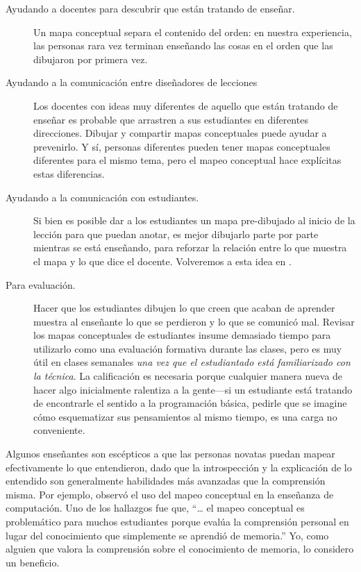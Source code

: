 \begin{description}

\item[Ayudando a docentes para descubrir que están tratando de enseñar.]
  Un mapa conceptual separa el contenido del orden:
  en nuestra experiencia,
  las personas rara vez terminan enseñando las cosas en el orden que las dibujaron por primera vez.

\item[Ayudando a la comunicación entre diseñadores de lecciones]
  Los docentes con ideas muy diferentes de aquello que están tratando de enseñar es probable que arrastren a sus estudiantes en diferentes direcciones.
  Dibujar y compartir mapas conceptuales puede ayudar a prevenirlo.
  Y sí,
  personas diferentes pueden tener mapas conceptuales diferentes para el mismo tema,
  pero el mapeo conceptual hace explícitas estas diferencias.

\item[Ayudando a la  comunicación con estudiantes.]
  Si bien es posible dar a los estudiantes un mapa pre-dibujado al inicio de la lección para   que puedan anotar,
  es mejor dibujarlo parte por parte mientras se está enseñando,
  para reforzar la relación entre lo que muestra el mapa y lo que dice el docente.
  Volveremos a esta idea en .

\item[Para evaluación.]
  Hacer que los estudiantes dibujen lo que creen que acaban de aprender
  muestra al enseñante lo que se perdieron y lo que se comunicó mal.
  Revisar los mapas conceptuales de estudiantes insume demasiado tiempo para utilizarlo como una evaluación formativa durante las clases,
  pero es muy útil en clases semanales \emph{una vez que el estudiantado está familiarizado con la técnica}.
  La calificación es necesaria porque
  cualquier manera nueva de hacer algo inicialmente ralentiza a la gente---si un estudiante está tratando de encontrarle el sentido a la programación básica,
  pedirle que se imagine cómo esquematizar sus pensamientos al mismo tiempo, es una carga no conveniente.

\end{description}

Algunos enseñantes son escépticos a que las personas novatas puedan mapear efectivamente lo que entendieron,
dado que la introspección y la explicación de lo entendido son generalmente habilidades más avanzadas que la comprensión misma.
Por ejemplo,
\cite{Kepp2008} observó el uso del mapeo conceptual en la enseñanza de computación.
Uno de los hallazgos fue que,
``{\ldots} el mapeo conceptual es problemático para muchos estudiantes porque
evalúa la comprensión personal en lugar del conocimiento que simplemente se aprendió de memoria.''
Yo, como alguien que valora la comprensión sobre el conocimiento de memoria,
lo considero un beneficio.

